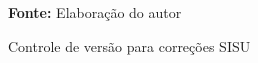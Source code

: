 \begin{figure}[ht!]
\centering

\caption{\textmd{Controle de versão para correções SISU}}
\label{fig:versaosisu}

\par\medskip\textbf{Fonte:} Elaboração do autor \par\medskip

\end{figure}

